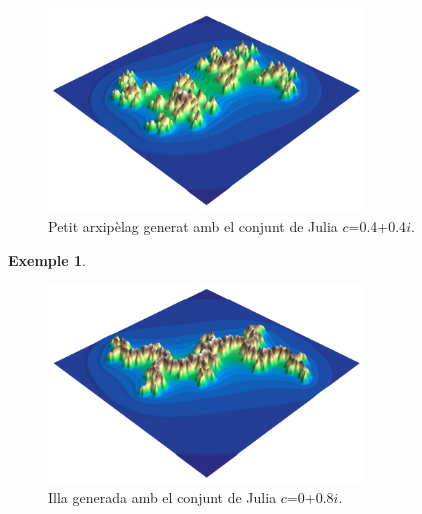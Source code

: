 \documentclass[12pt,a4paper]{report}
\newtheorem{eje}{Exemple}[chapter]
\begin{document}
\begin{figure}[!ht]
\centering
\includegraphics[width=0.75\textwidth]{img/julia_illa_01.png}
\caption{Petit arxipèlag generat amb el conjunt de Julia $c$=0.4+0.4$i$. }
\end{figure}
\newpage
\begin{eje}\hspace{0cm}
{
}
\end{eje}

\begin{figure}[!ht]
\centering
\includegraphics[width=0.75\textwidth]{img/julia_illa_02.png}
\caption{Illa generada amb el conjunt de Julia $c$=0+0.8$i$.}
\end{figure}
\newpage
\end{document}
